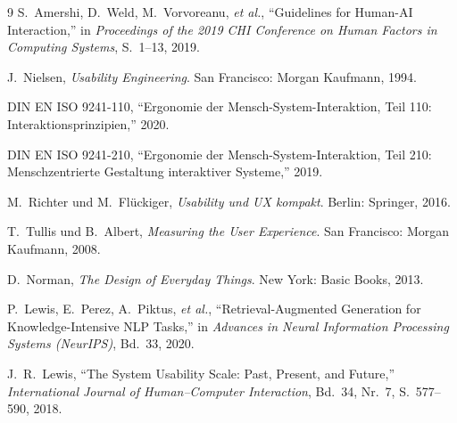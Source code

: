 \documentclass[12pt,a4paper]{article}
\begin{document}


\newpage
{}
\begin{thebibliography}{9}
S.~Amershi, D.~Weld, M.~Vorvoreanu, \emph{et al.},
``Guidelines for Human-AI Interaction,''
in \emph{Proceedings of the 2019 CHI Conference on Human Factors in Computing Systems},
S.~1--13, 2019.

J.~Nielsen,
\emph{Usability Engineering}.
San Francisco: Morgan Kaufmann, 1994.

DIN EN ISO 9241-110,
``Ergonomie der Mensch-System-Interaktion, Teil 110: Interaktionsprinzipien,''
2020.

DIN EN ISO 9241-210,
``Ergonomie der Mensch-System-Interaktion, Teil 210: Menschzentrierte Gestaltung interaktiver Systeme,''
2019.

M.~Richter und M.~Flückiger,
\emph{Usability und UX kompakt}.
Berlin: Springer, 2016.

T.~Tullis und B.~Albert,
\emph{Measuring the User Experience}.
San Francisco: Morgan Kaufmann, 2008.

D.~Norman,
\emph{The Design of Everyday Things}.
New York: Basic Books, 2013.

P.~Lewis, E.~Perez, A.~Piktus, \emph{et al.},
``Retrieval-Augmented Generation for Knowledge-Intensive NLP Tasks,''
in \emph{Advances in Neural Information Processing Systems (NeurIPS)},
Bd.~33, 2020.

J.~R.~Lewis,
``The System Usability Scale: Past, Present, and Future,''
\emph{International Journal of Human--Computer Interaction},
Bd.~34, Nr.~7, S.~577--590, 2018.
\end{thebibliography}
\end{document}
